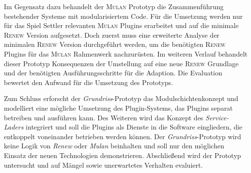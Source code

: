 	Im Gegensatz dazu behandelt der \textsc{Mulan} Prototyp die Zusammenführung bestehender Systeme mit modularisiertem Code. Für die Umsetzung werden nur für das Spiel Settler relevanten \textsc{Mulan} Plugins erarbeitet und auf die minimale \textsc{Renew} Version aufgesetzt. Doch zuerst muss eine erweiterte Analyse der minimalen \textsc{Renew} Version durchgeführt werden, um die benötigten \textsc{Renew} Plugins für das \textsc{Mulan} Rahmenwerk nachzurüsten. Im weiteren Verlauf behandelt dieser Prototyp Konsequenzen der Umstellung auf eine neue \textsc{Renew} Grundlage und der benötigten Ausführungsschritte für die Adaption. Die Evaluation bewertet den Aufwand für die Umsetzung des Prototyps. \bigbreak

	Zum Schluss erforscht der \textit{Grundriss}-Prototyp das Modulschichtenkonzept und modelliert eine mögliche Umsetzung des Plugin-Systems, das Plugins separat betreiben und ausführen kann. Des Weiteren wird das Konzept des \textit{Service-Laders} integriert und soll die Plugins als Dienste in die Software eingliedern, die entkoppelt voneinander betrieben werden können. \newline
	Der \textit{Grundriss}-Prototyp wird keine Logik von \textit{Renew} oder \textit{Mulan} beinhalten und soll nur den möglichen Einsatz der neuen Technologien demonstrieren. \newline
	Abschließend wird der Prototyp untersucht und auf Mängel sowie unerwartetes Verhalten evaluiert.


